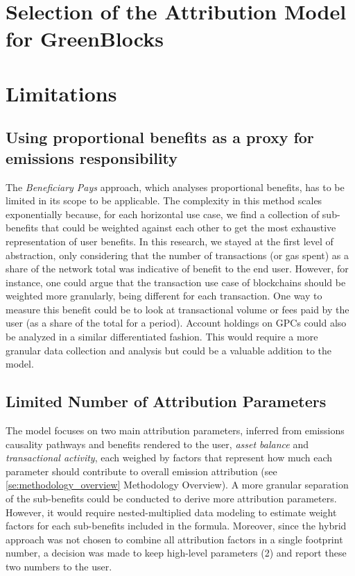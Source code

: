 \documentclass[11pt]{report}
\begin{document}
\section{Selection of the Attribution Model for GreenBlocks}


\section{Limitations}

\subsection*{Using proportional benefits as a proxy for emissions responsibility}
The \textit{Beneficiary Pays} approach, which analyses proportional benefits, has to be limited in its scope to be applicable. The complexity in this method scales exponentially because, for each horizontal use case, we find a collection of sub-benefits that could be weighted against each other to get the most exhaustive representation of user benefits. In this research, we stayed at the first level of abstraction, only considering that the number of transactions (or gas spent) as a share of the network total was indicative of benefit to the end user. However, for instance, one could argue that the transaction use case of blockchains should be weighted more granularly, being different for each transaction. One way to measure this benefit could be to look at transactional volume or fees paid by the user (as a share of the total for a period). Account holdings on GPCs could also be analyzed in a similar differentiated fashion. This would require a more granular data collection and analysis but could be a valuable addition to the model.

\subsection{Limited Number of Attribution Parameters}
The model focuses on two main attribution parameters, inferred from emissions causality pathways and benefits rendered to the user, \textit{asset balance} and \textit{transactional activity}, each weighed by factors that represent how much each parameter should contribute to overall emission attribution (see \ref{se:methodology_overview} Methodology Overview). A more granular separation of the sub-benefits could be conducted to derive more attribution parameters. However, it would require nested-multiplied data modeling to estimate weight factors for each sub-benefits included in the formula. Moreover, since the hybrid approach was not chosen to combine all attribution factors in a single footprint number, a decision was made to keep high-level parameters (2) and report these two numbers to the user.
\end{document}
